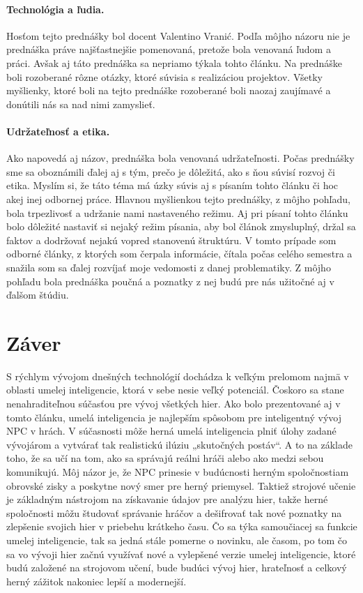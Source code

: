\documentclass[10pt,twoside,slovak,a4paper]{article}
\begin{document}
\paragraph{Technológia a ľudia.}Hosťom tejto prednášky bol docent Valentino Vranić. Podľa môjho názoru nie je prednáška práve najšťastnejšie pomenovaná, pretože bola venovaná ľudom a práci. Avšak aj táto prednáška sa nepriamo týkala tohto článku. Na prednáške boli rozoberané rôzne otázky, ktoré súvisia s realizáciou projektov. Všetky myšlienky, ktoré boli na tejto prednáške rozoberané boli naozaj zaujímavé a donútili nás sa nad nimi zamyslieť.

\paragraph{Udržateľnosť a etika.}Ako napovedá aj názov, prednáška bola venovaná udržateľnosti. Počas prednášky sme sa oboznámili ďalej aj s tým, prečo je dôležitá, ako s ňou súvisí rozvoj či etika. Myslím si, že táto téma má úzky súvis aj s písaním tohto článku či hoc akej inej odbornej práce. Hlavnou myšlienkou tejto prednášky, z môjho pohľadu, bola trpezlivosť a udržanie nami nastaveného režimu. Aj pri písaní tohto článku bolo dôležité nastaviť si nejaký režim písania, aby bol článok zmysluplný, držal sa faktov a dodržovať nejakú vopred stanovenú štruktúru. V tomto prípade som odborné články, z ktorých som čerpala informácie, čítala počas celého semestra a snažila som sa ďalej rozvíjať moje vedomosti z danej problematiky. Z môjho pohľadu bola prednáška poučná a poznatky z nej budú pre nás užitočné aj v ďalšom štúdiu. 


\section{Záver} \label{zaver} 
\quad S rýchlym vývojom dnešných technológií dochádza k veľkým prelomom najmä v oblasti umelej inteligencie, ktorá v sebe nesie veľký potenciál. Čoskoro sa stane nenahraditeľnou súčasťou pre vývoj všetkých hier. Ako bolo prezentované aj v tomto článku, umelá inteligencia je najlepším spôsobom pre inteligentný vývoj NPC v hrách. V súčasnosti môže herná umelá inteligencia plniť úlohy zadané vývojárom a vytvárať tak realistickú ilúziu „skutočných postáv“. A to na základe toho, že sa učí na tom, ako sa správajú reálni hráči alebo ako medzi sebou komunikujú. Môj názor je, že NPC prinesie v budúcnosti herným spoločnostiam obrovské zisky a poskytne nový smer pre herný priemysel. Taktiež strojové učenie je základným nástrojom na získavanie údajov pre analýzu hier, takže herné spoločnosti môžu študovať správanie hráčov a dešifrovať tak nové poznatky na zlepšenie svojich hier v priebehu krátkeho času. Čo sa týka samoučiacej sa funkcie umelej inteligencie, tak sa jedná stále pomerne o novinku, ale časom, po tom čo sa vo vývoji hier začnú využívať nové a vylepšené verzie umelej inteligencie, ktoré budú založené na strojovom učení, bude budúci vývoj hier, hrateľnosť a celkový herný zážitok nakoniec lepší a modernejší.
\end{document}
